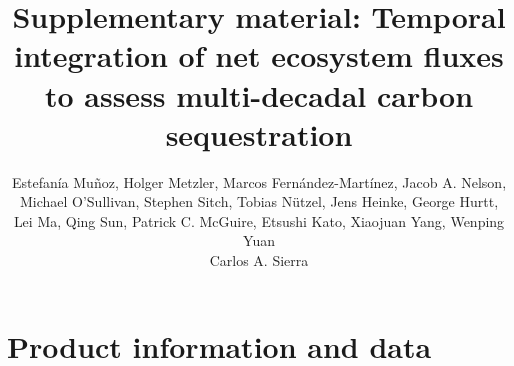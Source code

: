 \documentclass[10pt]{article}
\title{Supplementary material: Temporal integration of net ecosystem fluxes to assess multi-decadal carbon sequestration}
\author{
Estefanía Muñoz, Holger Metzler, Marcos Fernández-Martínez, Jacob A. Nelson, \\ Michael O'Sullivan, Stephen Sitch, Tobias Nützel, Jens Heinke, George Hurtt, \\
Lei Ma, Qing Sun, Patrick C. McGuire, Etsushi Kato, Xiaojuan Yang, Wenping Yuan \\
Carlos A. Sierra
}
\begin{document}
\renewcommand{\thesection}{S\arabic{section}}
\renewcommand{\thefigure}{S\arabic{figure}}
\renewcommand{\thetable}{S\arabic{table}}


\maketitle
 

\section{Product information and data}
\end{document}
